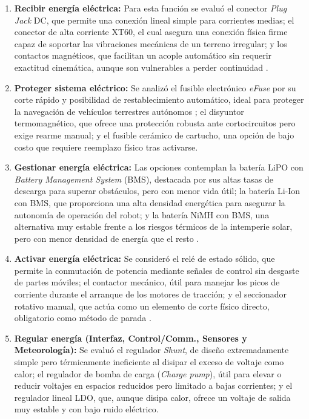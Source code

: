 \documentclass[../../General.tex]{subfiles}
\begin{document}
\begin{enumerate}
	\item \textbf{Recibir energía eléctrica:} Para esta función se evaluó el conector \textit{Plug Jack} DC, que permite una conexión lineal simple para corrientes medias; el conector de alta corriente XT60, el cual asegura una conexión física firme capaz de soportar las vibraciones mecánicas de un terreno irregular; y los contactos magnéticos, que facilitan un acople automático sin requerir exactitud cinemática, aunque son vulnerables a perder continuidad \citep{Salinas2025}.
	
	\item \textbf{Proteger sistema eléctrico:} Se analizó el fusible electrónico \textit{eFuse} por su corte rápido y posibilidad de restablecimiento automático, ideal para proteger la navegación de vehículos terrestres autónomos \citep{CN221163061U}; el disyuntor termomagnético, que ofrece una protección robusta ante cortocircuitos pero exige rearme manual; y el fusible cerámico de cartucho, una opción de bajo costo que requiere reemplazo físico tras activarse.
	
	\item \textbf{Gestionar energía eléctrica:} Las opciones contemplan la batería LiPO con \textit{Battery Management System} (BMS), destacada por sus altas tasas de descarga para superar obstáculos, pero con menor vida útil; la batería Li-Ion con BMS, que proporciona una alta densidad energética para asegurar la autonomía de operación del robot; y la batería NiMH con BMS, una alternativa muy estable frente a los riesgos térmicos de la intemperie solar, pero con menor densidad de energía que el resto \citep{XPower2024}.
	
	\item \textbf{Activar energía eléctrica:} Se consideró el relé de estado sólido, que permite la conmutación de potencia mediante señales de control sin desgaste de partes móviles; el contactor mecánico, útil para manejar los picos de corriente durante el arranque de los motores de tracción; y el seccionador rotativo manual, que actúa como un elemento de corte físico directo, obligatorio como método de parada \citep{Burriana5MW}.
	
	\item \textbf{Regular energía (Interfaz, Control/Comm., Sensores y Meteorología):} Se evaluó el regulador \textit{Shunt}, de diseño extremadamente simple pero térmicamente ineficiente al disipar el exceso de voltaje como calor; el regulador de bomba de carga (\textit{Charge pump}), útil para elevar o reducir voltajes en espacios reducidos pero limitado a bajas corrientes; y el regulador lineal LDO, que, aunque disipa calor, ofrece un voltaje de salida muy estable y con bajo ruido eléctrico.
	

\end{enumerate}
\end{document}
